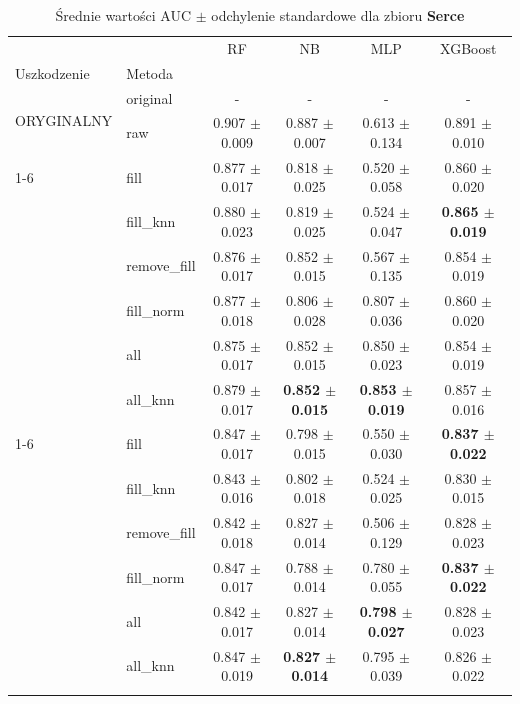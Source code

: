 \begin{table}[htbp]
\caption{Średnie wartości AUC $\pm$ odchylenie standardowe dla zbioru \textbf{Serce}}
\label{tab:wyniki_serce}
\begin{tabular}{llcccc}
\toprule
 &  & RF & NB & MLP & XGBoost \\
Uszkodzenie & Metoda &  &  &  &  \\
\midrule
\multirow[t]{2}{*}{ORYGINALNY} & original & - & - & - & - \\
 & raw & 0.907 $\pm$ 0.009 & 0.887 $\pm$ 0.007 & 0.613 $\pm$ 0.134 & 0.891 $\pm$ 0.010 \\
\cline{1-6}
\multirow[t]{7}{*}{10%
 & fill & 0.877 $\pm$ 0.017 & 0.818 $\pm$ 0.025 & 0.520 $\pm$ 0.058 & 0.860 $\pm$ 0.020 \\
 & fill_knn & 0.880 $\pm$ 0.023 & 0.819 $\pm$ 0.025 & 0.524 $\pm$ 0.047 & \textbf{0.865 $\pm$ 0.019} \\
 & remove_fill & 0.876 $\pm$ 0.017 & 0.852 $\pm$ 0.015 & 0.567 $\pm$ 0.135 & 0.854 $\pm$ 0.019 \\
 & fill_norm & 0.877 $\pm$ 0.018 & 0.806 $\pm$ 0.028 & 0.807 $\pm$ 0.036 & 0.860 $\pm$ 0.020 \\
 & all & 0.875 $\pm$ 0.017 & 0.852 $\pm$ 0.015 & 0.850 $\pm$ 0.023 & 0.854 $\pm$ 0.019 \\
 & all_knn & 0.879 $\pm$ 0.017 & \textbf{0.852 $\pm$ 0.015} & \textbf{0.853 $\pm$ 0.019} & 0.857 $\pm$ 0.016 \\
\cline{1-6}
\multirow[t]{7}{*}{20%
 & fill & 0.847 $\pm$ 0.017 & 0.798 $\pm$ 0.015 & 0.550 $\pm$ 0.030 & \textbf{0.837 $\pm$ 0.022} \\
 & fill_knn & 0.843 $\pm$ 0.016 & 0.802 $\pm$ 0.018 & 0.524 $\pm$ 0.025 & 0.830 $\pm$ 0.015 \\
 & remove_fill & 0.842 $\pm$ 0.018 & 0.827 $\pm$ 0.014 & 0.506 $\pm$ 0.129 & 0.828 $\pm$ 0.023 \\
 & fill_norm & 0.847 $\pm$ 0.017 & 0.788 $\pm$ 0.014 & 0.780 $\pm$ 0.055 & \textbf{0.837 $\pm$ 0.022} \\
 & all & 0.842 $\pm$ 0.017 & 0.827 $\pm$ 0.014 & \textbf{0.798 $\pm$ 0.027} & 0.828 $\pm$ 0.023 \\
 & all_knn & 0.847 $\pm$ 0.019 & \textbf{0.827 $\pm$ 0.014} & 0.795 $\pm$ 0.039 & 0.826 $\pm$ 0.022 \\
}}
\end{tabular}
\end{table}
